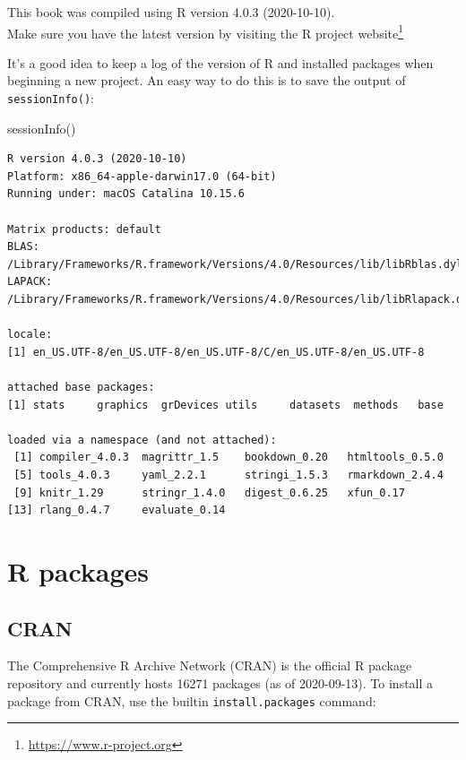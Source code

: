 \documentclass[
]{book}
\newenvironment{Shaded}{\begin{snugshade}}{\end{snugshade}}
\newcommand{\FunctionTok}[1]{\textcolor[rgb]{0.00,0.00,0.00}{#1}}
\newcommand{\NormalTok}[1]{#1}
\DeclareRobustCommand{\href}[2]{#2\footnote{\url{#1}}}
\renewcommand{\href}[2]{#2\footnote{\url{#1}}}
\begin{document}
This book was compiled using R version 4.0.3 (2020-10-10).\\
Make sure you have the latest version by visiting the \href{https://www.r-project.org}{R project website}

It's a good idea to keep a log of the version of R and installed packages when beginning a new project. An easy way to do this is to save the output of \texttt{sessionInfo()}:

\begin{Shaded}
\begin{Highlighting}[]
\FunctionTok{sessionInfo}\NormalTok{()}
\end{Highlighting}
\end{Shaded}

\begin{verbatim}
R version 4.0.3 (2020-10-10)
Platform: x86_64-apple-darwin17.0 (64-bit)
Running under: macOS Catalina 10.15.6

Matrix products: default
BLAS:   /Library/Frameworks/R.framework/Versions/4.0/Resources/lib/libRblas.dylib
LAPACK: /Library/Frameworks/R.framework/Versions/4.0/Resources/lib/libRlapack.dylib

locale:
[1] en_US.UTF-8/en_US.UTF-8/en_US.UTF-8/C/en_US.UTF-8/en_US.UTF-8

attached base packages:
[1] stats     graphics  grDevices utils     datasets  methods   base     

loaded via a namespace (and not attached):
 [1] compiler_4.0.3  magrittr_1.5    bookdown_0.20   htmltools_0.5.0
 [5] tools_4.0.3     yaml_2.2.1      stringi_1.5.3   rmarkdown_2.4.4
 [9] knitr_1.29      stringr_1.4.0   digest_0.6.25   xfun_0.17      
[13] rlang_0.4.7     evaluate_0.14  
\end{verbatim}

\hypertarget{r-packages}{%
\section{R packages}\label{r-packages}}

\hypertarget{cran}{%
\subsection{CRAN}\label{cran}}

The Comprehensive R Archive Network (CRAN) is the official R package repository and currently hosts 16271 packages (as of 2020-09-13). To install a package from CRAN, use the builtin \texttt{install.packages} command:
\end{document}
